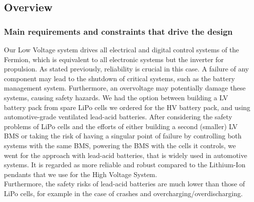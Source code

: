 \subsection{Overview}
\graphicspath{ {./texfiles/electrical/eimc/} }
\subsubsection*{Main requirements and constraints that drive the design}
\par Our Low Voltage system drives all electrical and digital control systems of the Fermion, which 
is equivalent to all electronic systems but the inverter for propulsion. As stated previously,
reliability is crucial in this case. A failure of any component may lead to the shutdown of critical systems, such as the battery management system.
Furthermore, an overvoltage may potentially damage these systems, causing safety hazards. We had the option between building a LV battery pack from spare LiPo cells we ordered for the HV battery pack, and using automotive-grade ventilated lead-acid batteries.
After considering the safety problems of LiPo cells and the efforts of either building a second (smaller) LV BMS or taking the risk of having a singular point of failure by controlling both systems with the same BMS, powering the BMS with the cells it controls, we went for the approach with lead-acid batteries, that is widely used in automotive systems. It is regarded as more reliable and robust compared to the Lithium-Ion pendants that we use for the High Voltage System. \\
Furthermore, the safety risks of lead-acid batteries are much lower than those of LiPo cells, for example in the case of
crashes and overcharging/overdischarging.\\
